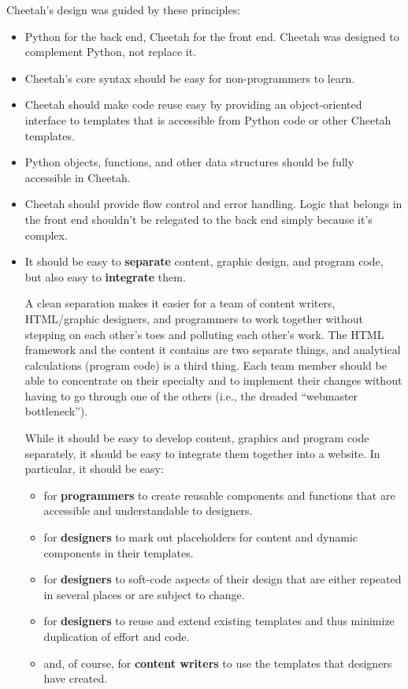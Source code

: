 Cheetah's design was guided by these principles:
\begin{itemize}
\item Python for the back end, Cheetah for the front end.  Cheetah was
     designed to complement Python, not replace it.
     
\item Cheetah's core syntax should be easy for non-programmers to learn.
          
\item Cheetah should make code reuse easy by providing an object-oriented
     interface to templates that is accessible from Python code or other
     Cheetah templates.
     
\item Python objects, functions, and other data structures should be fully
     accessible in Cheetah.
       
\item Cheetah should provide flow control and error handling.  Logic
     that belongs in the front end shouldn't be relegated to the 
     back end simply because it's complex.

\item It should be easy to {\bf separate} content, graphic design, and program
     code, but also easy to {\bf integrate} them.

     A clean separation makes it easier for a team of content writers,
     HTML/graphic designers, and programmers to work together without stepping
     on each other's toes and polluting each other's work.  The HTML framework
     and the content it contains are two separate things, and analytical
     calculations (program code) is a third thing.  Each team member should be
     able to concentrate on their specialty and to implement their changes
     without having to go through one of the others (i.e., the dreaded
     ``webmaster bottleneck'').
     
     While it should be easy to develop content, graphics and program
     code separately, it should be easy to integrate them together into a 
     website.  In particular, it should be easy:

     \begin{itemize}
     \item for {\bf programmers} to create reusable components and functions
          that are accessible and understandable to designers.
     \item for {\bf designers} to mark out placeholders for content and 
          dynamic components in their templates.
     \item for {\bf designers} to soft-code aspects of their design that are
          either repeated in several places or are subject to change.
     \item for {\bf designers} to reuse and extend existing templates and thus
          minimize duplication of effort and code.
     \item and, of course, for {\bf content writers} to use the templates that
          designers have created.
     \end{itemize}

\end{itemize}

